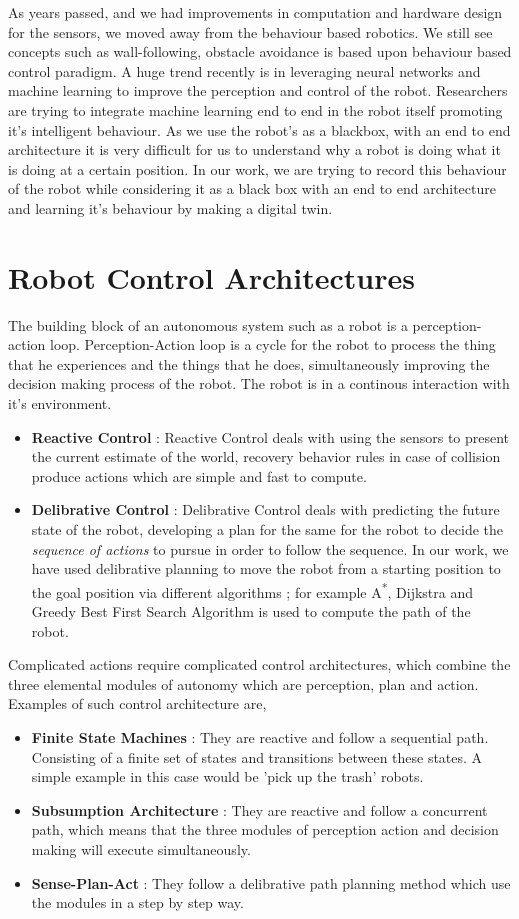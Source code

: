 As years passed, and we had improvements in computation and hardware design for the sensors, we moved away from the behaviour based robotics. We still see concepts such as wall-following, obstacle avoidance is based upon behaviour based control paradigm.
A huge trend recently is in leveraging neural networks and machine learning to improve the perception and control of the robot. Researchers are trying to integrate machine learning end to end in the robot itself promoting it's intelligent behaviour. As we use the robot's as a blackbox, with an end to end architecture it is very difficult for us to understand why a robot is doing what it is doing at a certain position.
In our work, we are trying to record this behaviour of the robot while considering it as a black box with an end to end architecture and learning it's behaviour by making a digital twin.
\section{Robot Control Architectures}
The building block of an autonomous system such as a robot is a perception-action loop. Perception-Action loop is a cycle for the robot to process the thing that he experiences and the things that he does, simultaneously improving the decision making process of the robot. The robot is in a continous interaction with it's environment. 
\begin{itemize}
    \item \textbf{Reactive Control} : Reactive Control deals with using the sensors to present the current estimate of the world, recovery behavior rules in case of collision produce actions which are simple and fast to compute.
    \item \textbf{Delibrative Control} : Delibrative Control deals with predicting the future state of the robot, developing a plan for the same for the robot to decide the \textit{sequence of actions} to pursue in order to follow the sequence. In our work, we have used delibrative planning to move the robot from a starting position to the goal position via different algorithms ; for example A\textsuperscript{*}, Dijkstra and Greedy Best First Search Algorithm is used to compute the path of the robot.
\end{itemize}
Complicated actions require complicated control architectures, which combine the three elemental modules of autonomy which are perception, plan and action. Examples of such control architecture are,
\begin{itemize}
    \item \textbf{Finite State Machines} : They are reactive and follow a sequential path. Consisting of a finite set of states and transitions between these states. A simple example in this case would be 'pick up the trash' robots.
    \item \textbf{Subsumption Architecture} : They are reactive and follow a concurrent path, which means that the three modules of perception action and decision making will execute simultaneously.
    \item \textbf{Sense-Plan-Act} : They follow a delibrative path planning method which use the modules in a step by step way.
\end{itemize}

